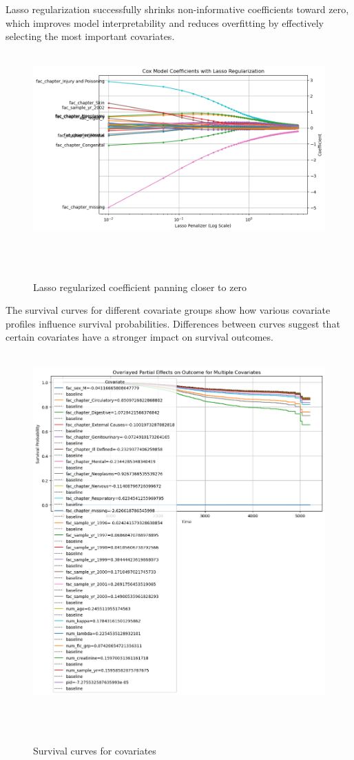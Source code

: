 \clearpage
\noindent Lasso regularization successfully shrinks non-informative coefficients toward zero, which improves model interpretability and reduces overfitting by effectively selecting the most important covariates.
\begin{figure}[h]
    \centering
    \includegraphics[width=\linewidth]{Figures/SURV/lasso_reg.png}
    \caption{Lasso regularized coefficient panning closer to zero}
    \label{fig:lass}
\end{figure}

\noindent The survival curves for different covariate groups show how various covariate profiles influence survival probabilities. Differences between curves suggest that certain covariates have a stronger impact on survival outcomes.
\begin{figure}[h]
    \centering
    \includegraphics[width=\linewidth]{Figures/SURV/cox_overlay.png}
    \caption{Survival curves for covariates}
    \label{fig:survival_cur}
\end{figure}


